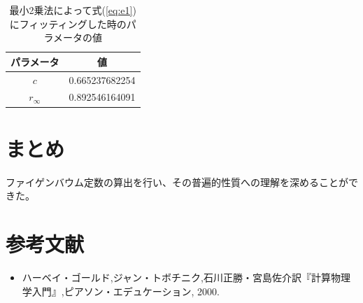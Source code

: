 \documentclass{jsarticle}
\begin{document}
\begin{enumerate}
\begin{enumerate}
   \begin{table}[htbp]
    \begin{center}
     \caption{最小2乗法によって式(\ref{eq:e1})にフィッティングした時のパラメータの値}
     \begin{tabular}{cc}
      パラメータ & 値  \\ \hline
	$c$ & 0.665237682254 \\
	$r_{\infty}$ & 0.892546164091 \\
	\hline
     \end{tabular}
     \label{tab:t2}
    \end{center}
   \end{table}
   
  \end{enumerate}
\end{enumerate}
\section{まとめ}
ファイゲンバウム定数の算出を行い、その普遍的性質への理解を深めることができた。

\section{参考文献}
\begin{itemize}
 \item ハーベイ・ゴールド,ジャン・トボチニク,石川正勝・宮島佐介訳『計算物理学入門』,ピアソン・エデュケーション, 2000.
\end{itemize}
\end{document}

